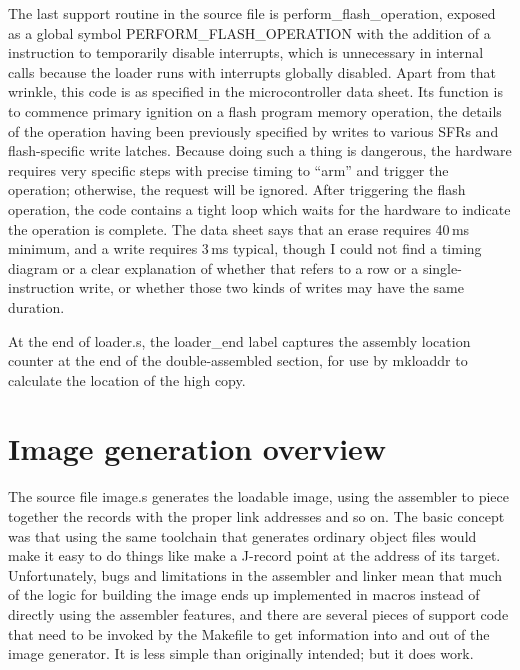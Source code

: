 The last support routine in the source file is perform\_flash\_operation,
exposed as a global symbol PERFORM\_FLASH\_OPERATION with the addition of a
 instruction to temporarily disable interrupts, which is
unnecessary in internal calls because the loader runs with interrupts
globally disabled.  Apart from that wrinkle, this code is as specified in
the microcontroller data sheet.  Its function is to commence primary
ignition on a flash program memory operation, the details of the operation
having been previously specified by writes to various SFRs and
flash-specific write latches.  Because doing such a thing is dangerous, the
hardware requires very specific steps with precise timing to ``arm'' and
trigger the operation; otherwise, the request will be ignored.  After
triggering the flash operation, the code contains a tight loop which waits
for the hardware to indicate the operation is complete.  The data sheet says
that an erase requires 40\,ms minimum, and a write requires 3\,ms typical,
though I could not find a timing diagram or a clear explanation of whether
that refers to a row or a single-instruction write, or whether those two
kinds of writes may have the same duration.

At the end of loader.s, the loader\_end label captures the assembly location
counter at the end of the double-assembled section, for use by mkloaddr to
calculate the location of the high copy.

\section{Image generation overview}

The source file image.s generates the loadable image, using the assembler to
piece together the records with the proper link addresses and so on.  The
basic concept was that using the same toolchain that generates ordinary
object files would make it easy to do things like make a J-record point at
the address of its target.  Unfortunately, bugs and limitations in the
assembler and linker mean that much of the logic for building the image ends
up implemented in macros instead of directly using the
assembler features, and there are several pieces of support code that need
to be invoked by the Makefile to get information into and out of the image
generator.  It is less simple than originally intended; but it does work.


